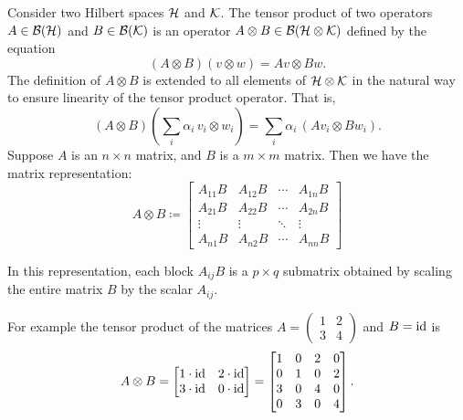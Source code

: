 \begin{definition}
  Consider two Hilbert spaces $\mathcal{H}$ and $\mathcal{K}$. 
  The tensor product of two operators $A \in \mathcal{B}(\mathcal{H}) $ and $B \in   \mathcal{B}(\mathcal{K})$ is an operator $A \otimes B \in  \mathcal{B}(\mathcal{H} \otimes \mathcal{K}) $ defined by the equation
\begin{equation*}
  (A \otimes B)(v \otimes w) = Av \otimes Bw.
\end{equation*}
The definition of $A \otimes B$ is extended to all elements of $\mathcal{H} \otimes \mathcal{K}$ in the natural way to ensure linearity of the tensor product operator. That is,
\begin{equation*} \label{eq:linear_tensor_operator}
(A \otimes B) \left( \sum_i \alpha_i\, v_i \otimes w_i \right)
= \sum_i \alpha_i\, (A v_i \otimes B w_i).
\end{equation*}
Suppose $A$ is an $n \times n$ matrix, and $B$ is a $m \times m$ matrix. Then we have the matrix representation:
\begin{equation*} \label{eq:matrix_tensor_product}
A \otimes B \coloneqq
\begin{bmatrix}
A_{11} B & A_{12} B & \cdots & A_{1n} B \\
A_{21} B & A_{22} B & \cdots & A_{2n} B \\
\vdots   & \vdots   & \ddots & \vdots   \\
A_{n1} B & A_{n2} B & \cdots & A_{nn} B
\end{bmatrix}
\end{equation*}

In this representation, each block $A_{ij} B$ is a $p \times q$ submatrix 
obtained by scaling the entire matrix $B$ by the scalar $A_{ij}$.


For example the tensor product of the matrices $A= \left(\begin{smallmatrix}
    1 & 2 \\
    3 & 4
  \end{smallmatrix}\right) $ and $B=\mathrm{id} $ is
\begin{equation} \label{eq:pauli_tensor}
A \otimes B =
\begin{bmatrix}
1 \cdot \mathrm{id} & 2 \cdot \mathrm{id} \\
3 \cdot \mathrm{id} & 0 \cdot \mathrm{id}
\end{bmatrix}
=
\begin{bmatrix}
1 & 0 & 2 & 0 \\
0 & 1 & 0 & 2 \\
3 & 0 & 4 & 0 \\
0 & 3 & 0 & 4
\end{bmatrix}.
\end{equation}

\end{definition}


